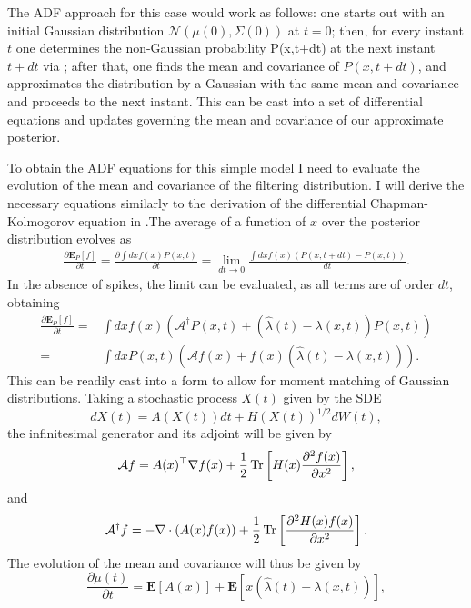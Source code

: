{The ADF approach for this case would work as follows: one starts out with an initial Gaussian distribution $\mathcal{N}(\mu(0),\Sigma(0))$ at $t=0$; then, for every instant $t$ one 
determines the non-Gaussian probability P(x,t+dt) at the next instant $t+dt$ via ; after that, one finds the mean and covariance of $P(x,t+dt)$, and approximates the 
distribution by a Gaussian with the same mean and covariance and proceeds to the next instant. This can be cast into a set of differential equations and updates governing the
mean and covariance of our approximate posterior.
\par

To obtain the ADF equations for this simple model I need to evaluate the evolution of the mean and covariance of the filtering distribution. I will derive the
necessary equations similarly to the derivation of the differential Chapman-Kolmogorov equation in .The average of
a function of $x$ over the posterior distribution evolves as
\begin{align*}
\frac{\partial \boldsymbol{E}_P[f]}{\partial t} = \frac{\partial \int dx f(x) P(x,t)}{\partial t} = \lim_{dt\to 0} \frac{\int dx f(x) \left(P(x,t+dt)-P(x,t)\right)}{dt}.
\end{align*}
In the absence of spikes, the limit can be evaluated, as all terms are of order $dt$, obtaining
\begin{align*}
\frac{\partial \boldsymbol{E}_P[f]}{\partial t} =& \int dx f(x) \left(\mathcal{A}^\dagger P(x,t) + (\hat{\lambda}(t) - \lambda(x,t) ) P(x,t)\right) \\
=&\int dx  P(x,t) \left(\mathcal{A} f(x)+ f(x) (\hat{\lambda}(t) - \lambda(x,t) ) \right).
\end{align*}
This can be readily cast into a form to allow for moment matching of Gaussian distributions. Taking a stochastic process $X(t)$ given by the SDE
\[
dX(t) = A\left(X(t)\right) dt + H\left(X(t)\right)^{1/2} dW(t),
\]
the infinitesimal generator and its adjoint will be given by
\[
\mathcal{A} f = A(x)^\top \nabla f(x) +  \frac{1}{2}\operatorname{Tr}\left[H(x) \frac{\partial^2 f(x)}{\partial x^2}\right],
\]
and
\[
\mathcal{A}^\dagger f = -\nabla \cdot\left(A(x) f(x)\right) + \frac{1}{2}\operatorname{Tr}\left[ \frac{\partial^2 H(x) f(x)}{\partial x^2}\right].
\]
The evolution of the mean and covariance will thus be given by
\begin{subequations}
\begin{equation}
\frac{\partial \mu(t)}{\partial t } = \boldsymbol{E}\left[A(x)\right] + \boldsymbol{E}\left[x \left(\hat{\lambda}(t) -\lambda(x,t)\right)\right],

\end{equation}
\end{subequations}}
